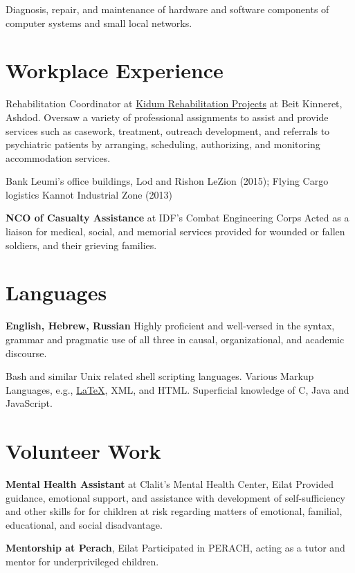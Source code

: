\par{\par} %

{\computercert}
{Diagnosis, repair, and maintenance of hardware and software components of computer systems and small local networks.}
{}

\section{Workplace Experience} %

{Rehabilitation Coordinator at \href{http://www.kidumpro.co.il/}{Kidum Rehabilitation Projects} at Beit Kinneret, Ashdod.} %
{Oversaw a variety of professional assignments to assist and provide services such as casework, treatment, outreach development, and referrals to psychiatric patients by arranging, scheduling, authorizing, and monitoring accommodation services.}
{}

{\securityguardrec} 
{Bank Leumi's office buildings, Lod and Rishon LeZion (2015);
Flying Cargo logistics Kannot Industrial Zone (2013)}
{}

{\textbf{NCO of Casualty Assistance} at IDF's Combat Engineering Corps} 
{Acted as a liaison for medical, social, and memorial services provided for wounded or fallen soldiers, and their grieving families.}
{}

\section{Languages} %

{\textbf{English, Hebrew, Russian}}
{Highly proficient and well-versed in the syntax, grammar and pragmatic use of all three in causal, organizational, and academic discourse.}
{}

{Bash and similar Unix related shell scripting languages. Various Markup Languages, e.g., \href{https://github.com/kiril-u/kiril-resume-2021-1/}{\LaTeX}, XML, and HTML. Superficial knowledge of C, Java and JavaScript.}
{}

\section{Volunteer Work} %
{\textbf{Mental Health Assistant} at Clalit's Mental Health Center, Eilat}
{Provided guidance, emotional support, and assistance with development of self-sufficiency and other skills for for children at risk regarding matters of emotional, familial, educational, and social disadvantage.}
{}

{\textbf{Mentorship at Perach}, Eilat}
{Participated in PERACH, acting as a tutor and mentor for underprivileged children.}
{} 
\unsetLTR 